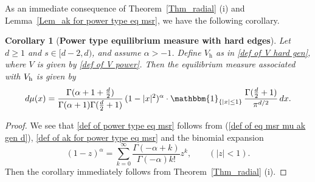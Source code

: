 \documentclass[10pt]{amsart}
\theoremstyle{plain}
\newtheorem{cor}[thm]{Corollary}
\theoremstyle{remark}
\numberwithin{equation}{section}
\begin{document}
As an immediate consequence of Theorem~\ref{Thm_radial} (i) and Lemma~\ref{Lem_ak for power type eq msr}, we have the following corollary.

\begin{cor}[\textbf{Power type equilibrium measure with hard edges}] \label{Cor_power type with hard edges}
Let $d \geq 1$ and $s \in [d-2,d)$, and assume $\alpha > -1$. 
Define $V_{\mathrm{h}}$ as in \eqref{def of V hard gen}, where $V$ is given by \eqref{def of V power}. Then the equilibrium measure associated with $V_{ \rm h }$ is given by
\begin{equation}  \label{def of power type eq msr}
 d\mu(x) = \frac{ \Gamma(\alpha+1+\frac{d}{2}) }{ \Gamma(\alpha+1)\Gamma(\frac{d}{2}+1) } \,  (1-|x|^2)^{\alpha}  \cdot  \mathbbm{1}_{ \{ |x| \le 1 \} } \, \frac{ \Gamma(\frac{d}{2}+1) }{\pi^{ d/2 }}\,dx.    
\end{equation}   
\end{cor}

\begin{proof}
We see that \eqref{def of power type eq msr} follows from (\ref{def of eq msr mu ak gen d}), \eqref{def of ak for power type eq msr} and the binomial expansion 
\begin{equation} \label{eq for binomial expansion}
(1-z)^{\alpha}= \sum_{k=0}^\infty \frac{ \Gamma(-\alpha+k) }{ \Gamma(-\alpha) k! } z^k, \qquad (|z|<1). 
\end{equation}
Then the corollary immediately follows from Theorem~\ref{Thm_radial} (i). 
\end{proof}
\end{document}
